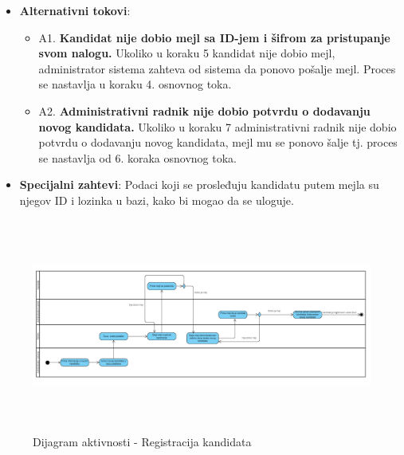\begin{itemize}
  \item \textbf{Alternativni tokovi}:
      \begin{itemize}
        \item A1. \textbf{Kandidat nije dobio mejl sa ID-jem i šifrom za pristupanje svom nalogu.}
        Ukoliko u koraku 5 kandidat nije dobio mejl, administrator sistema zahteva od sistema da ponovo pošalje mejl. Proces se nastavlja u koraku 4. osnovnog toka.
        \item A2. \textbf{Administrativni radnik nije dobio potvrdu o dodavanju novog kandidata.}
        Ukoliko u koraku 7 administrativni radnik nije dobio potvrdu o dodavanju novog kandidata, mejl mu se ponovo šalje tj. proces se nastavlja od 6. koraka osnovnog toka.
      \end{itemize}


  \item \textbf{Specijalni zahtevi}:\newline
  Podaci koji se prosleđuju kandidatu putem mejla su njegov ID i lozinka u bazi, kako bi mogao da se uloguje.
\end{itemize}

\begin{figure}[H]
  \begin{center}
      \includegraphics[width=160mm, height=70mm]{Diagrams/dijagram_aktivnosti_registracija_kandidata.png}
  \end{center}
  \caption {Dijagram aktivnosti - Registracija kandidata}
  \label{activity_registracija}

\end{figure}

